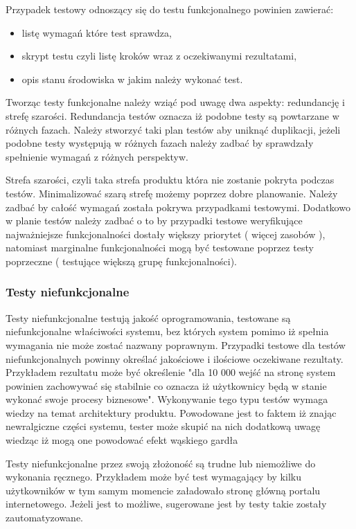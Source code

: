 Przypadek testowy odnoszący się do testu funkcjonalnego powinien zawierać:
\begin{itemize}
  \item  listę wymagań które test sprawdza,
  \item skrypt testu czyli listę kroków wraz z oczekiwanymi rezultatami,
  \item opis stanu środowiska w jakim należy wykonać test.
\end{itemize}

Tworząc testy funkcjonalne należy wziąć pod uwagę dwa aspekty: redundancję i strefę szarości. Redundancja testów oznacza iż podobne testy są powtarzane w różnych fazach. Należy stworzyć taki plan testów aby uniknąć duplikacji, jeżeli podobne testy występują w różnych fazach należy zadbać by sprawdzały spełnienie wymagań z różnych perspektyw. 

Strefa szarości, czyli taka strefa produktu która nie zostanie pokryta podczas testów. Minimalizować szarą strefę możemy poprzez dobre planowanie. Należy zadbać by całość wymagań została pokrywa przypadkami testowymi. Dodatkowo w planie testów należy zadbać o to by przypadki testowe weryfikujące najważniejsze funkcjonalności dostały większy priorytet ( więcej zasobów ), natomiast marginalne funkcjonalności mogą być testowane poprzez testy poprzeczne ( testujące większą grupę funkcjonalności).
\subsubsection{Testy niefunkcjonalne}
Testy niefunkcjonalne testują jakość oprogramowania, testowane są  niefunkcjonalne właściwości systemu, bez których system pomimo iż spełnia wymagania nie może zostać nazwany poprawnym. Przypadki testowe dla testów niefunkcjonalnych powinny określać jakościowe i ilościowe oczekiwane rezultaty. Przykładem rezultatu może być określenie "dla 10 000 wejść na stronę system powinien zachowywać się stabilnie co oznacza iż użytkownicy będą w stanie wykonać swoje procesy biznesowe". Wykonywanie tego typu testów wymaga wiedzy na temat architektury produktu. Powodowane jest to faktem iż znając newralgiczne części systemu, tester może skupić na nich dodatkową uwagę wiedząc iż mogą one powodować efekt wąskiego gardła


Testy niefunkcjonalne przez swoją złożoność są trudne lub niemożliwe do wykonania ręcznego. Przykładem może być test wymagający by kilku użytkowników w tym samym momencie załadowało stronę główną portalu internetowego. Jeżeli jest to możliwe, sugerowane jest by testy takie zostały zautomatyzowane.
